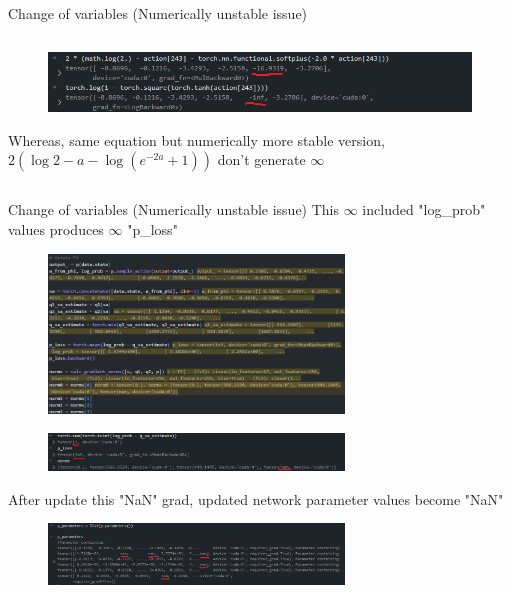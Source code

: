 \documentclass[8pt]{beamer}
\begin{document}
\begin{frame}{Change of variables (Numerically unstable issue)}
\begin{columns}
\begin{column}{0.5\textwidth}
            \begin{figure}
                \includegraphics[width=1.0\textwidth]{NumericallyStableLogProbofTanH.png}
            \end{figure}
            Whereas, same equation but numerically more stable version, $2 (\log{2} - a - \log{(e^{-2a} + 1)})$ don't generate $\infty$
        \end{column}
    \end{columns}
\end{frame}

\begin{frame}{Change of variables (Numerically unstable issue)}
    This $\infty$ included "log\_prob" values produces $\infty$ "p\_loss"
    \begin{figure}
        \includegraphics[width=0.7\textwidth]{UpdatePwithNaNGrad.png}
    \end{figure}
    \begin{figure}
        \includegraphics[width=0.7\textwidth]{NaNIncludedinGrad.png}
    \end{figure}
    After update this "NaN" grad, updated network parameter values become "NaN"
    \begin{figure}
        \includegraphics[width=0.7\textwidth]{NaNIncludedinP.png}
    \end{figure}
\end{frame}
\end{document}
